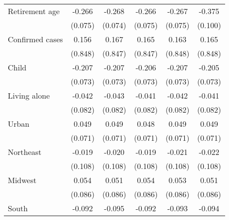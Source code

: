 {\begin{tabular}{l*{5}{c}}
\addlinespace
Retirement age      &      -0.266\sym{***}&      -0.268\sym{***}&      -0.266\sym{***}&      -0.267\sym{***}&      -0.375\sym{***}\\
                    &     (0.075)         &     (0.074)         &     (0.075)         &     (0.075)         &     (0.100)         \\
\addlinespace
Confirmed cases     &       0.156         &       0.167         &       0.165         &       0.163         &       0.165         \\
                    &     (0.848)         &     (0.847)         &     (0.847)         &     (0.848)         &     (0.848)         \\
\addlinespace
Child               &      -0.207\sym{***}&      -0.207\sym{***}&      -0.206\sym{***}&      -0.207\sym{***}&      -0.205\sym{***}\\
                    &     (0.073)         &     (0.073)         &     (0.073)         &     (0.073)         &     (0.073)         \\
\addlinespace
Living alone        &      -0.042         &      -0.043         &      -0.041         &      -0.042         &      -0.041         \\
                    &     (0.082)         &     (0.082)         &     (0.082)         &     (0.082)         &     (0.082)         \\
\addlinespace
Urban               &       0.049         &       0.049         &       0.048         &       0.049         &       0.049         \\
                    &     (0.071)         &     (0.071)         &     (0.071)         &     (0.071)         &     (0.071)         \\
\addlinespace
Northeast           &      -0.019         &      -0.020         &      -0.019         &      -0.021         &      -0.022         \\
                    &     (0.108)         &     (0.108)         &     (0.108)         &     (0.108)         &     (0.108)         \\
\addlinespace
Midwest             &       0.054         &       0.051         &       0.054         &       0.053         &       0.051         \\
                    &     (0.086)         &     (0.086)         &     (0.086)         &     (0.086)         &     (0.086)         \\
\addlinespace
South               &      -0.092         &      -0.095         &      -0.092         &      -0.093         &      -0.094         \\

\end{tabular}}
